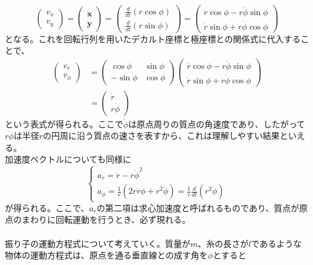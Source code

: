 \documentclass{jsarticle}
\begin{document}
\[\left(\begin{array}{c}
v_{x}\\
v_{y}\end{array}\right)=\left(\begin{array}{c}
\dot{\bm{x}}\\
\dot{\bm{y}}\end{array}\right)=\left(\begin{array}{c}
\frac{d}{dt}(r\cos\phi)\\
\frac{d}{dt}(r\sin\phi)\end{array}\right)=\left(\begin{array}{c}
\dot{r}\cos\phi-r\dot{\phi}\sin\phi\\
\dot{r}\sin\phi+r\dot{\phi}\cos\phi\end{array}\right)\]
となる。これを回転行列を用いたデカルト座標と極座標との関係式に代入することで、
\begin{align*}
\left(\begin{array}{c}
v_{r}\\
v_{\phi}\end{array}\right)&=\left(\begin{array}{cc}
\cos\phi & \sin\phi\\
-\sin\phi & \cos\phi\end{array}\right)\left(\begin{array}{c}
\dot{r}\cos\phi-r\dot{\phi}\sin\phi\\
\dot{r}\sin\phi+r\dot{\phi}\cos\phi\end{array}\right)\\
&=\left(\begin{array}{c}
\dot{r}\\
r\dot{\phi}\end{array}\right)
\end{align*}
という表式が得られる。ここで\(\dot{\phi}\)は原点周りの質点の角速度であり、したがって\(r\dot{\phi}\)は半径\(r\)の円周に沿う質点の速さを表すから、これは理解しやすい結果といえる。\\
加速度ベクトルについても同様に
\[\begin{cases}\displaystyle
a_{r}=\ddot{r}-r\dot{\phi}^2\\
a_{\phi}=\frac{1}{r}(2r\dot{r}\dot{\phi}+r^{2}\ddot{\phi})=\frac{1}{r}\frac{d}{dt}(r^{2}\dot{\phi})\end{cases}\]
が得られる。ここで、\(a_{r}\)の第二項は求心加速度と呼ばれるものであり、質点が原点のまわりに回転運動を行うとき、必ず現れる。\\
\\
振り子の運動方程式について考えていく。質量が\(m\)、糸の長さが\(l\)であるような物体の運動方程式は、原点を通る垂直線との成す角を\(\phi\)とすると
\end{document}
